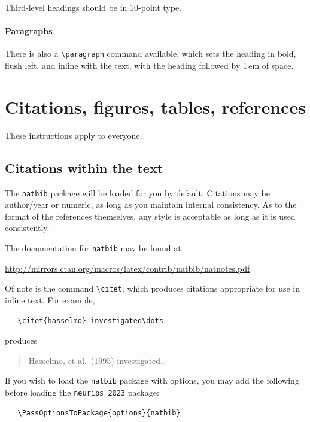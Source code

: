 \documentclass{article}
\begin{document}
Third-level headings should be in 10-point type.


\paragraph{Paragraphs}


There is also a \verb+\paragraph+ command available, which sets the heading in
bold, flush left, and inline with the text, with the heading followed by 1\,em
of space.


\section{Citations, figures, tables, references}
\label{others}


These instructions apply to everyone.


\subsection{Citations within the text}


The \verb+natbib+ package will be loaded for you by default.  Citations may be
author/year or numeric, as long as you maintain internal consistency.  As to the
format of the references themselves, any style is acceptable as long as it is
used consistently.


The documentation for \verb+natbib+ may be found at
\begin{center}
  \url{http://mirrors.ctan.org/macros/latex/contrib/natbib/natnotes.pdf}
\end{center}
Of note is the command \verb+\citet+, which produces citations appropriate for
use in inline text.  For example,
\begin{verbatim}
   \citet{hasselmo} investigated\dots
\end{verbatim}
produces
\begin{quote}
  Hasselmo, et al.\ (1995) investigated\dots
\end{quote}


If you wish to load the \verb+natbib+ package with options, you may add the
following before loading the \verb+neurips_2023+ package:
\begin{verbatim}
   \PassOptionsToPackage{options}{natbib}
\end{verbatim}
\end{document}

